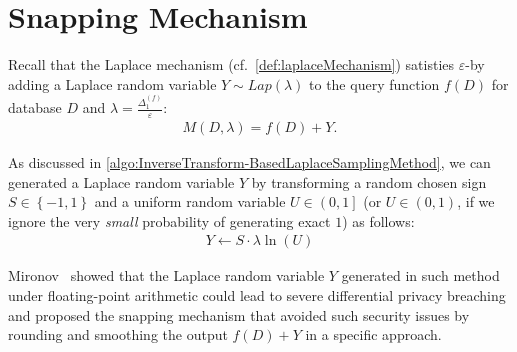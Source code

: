 \section{Snapping Mechanism}
\label{sec:snappingMechanism}
Recall that the Laplace mechanism (cf.~\autoref{def:laplaceMechanism}) satisties $\varepsilon$-\differentialprivacy by adding a Laplace random variable $Y \sim Lap\left(\lambda\right) $ to the query function $f\left(D\right)  $ for database $D$ and $\lambda = \frac{\Delta _{1}^{\left(f\right)}}{\varepsilon }$:
\begin{equation}
    \begin{split}
        M\left(D, \lambda\right)=f\left(D\right)+Y.
    \end{split}
\end{equation}


As discussed in \autoref{algo:InverseTransform-BasedLaplaceSamplingMethod}, we can generated a Laplace random variable $Y$ by transforming a random chosen sign $S\in \left\{-1,1\right\} $ and a uniform random variable $U \in \left(0,1\right] $ (or $U \in \left(0,1\right) $, if we ignore the very \textit{small} probability of generating exact $1$) as follows:
\begin{equation}
    \begin{split}
        Y \gets S \cdot \lambda \ln\left(U\right)
    \end{split}
\end{equation}

Mironov~\cite{mironov2012significance} showed that the Laplace random variable $Y$ generated in such method under floating-point arithmetic could lead to severe differential privacy breaching and proposed the snapping mechanism that avoided such security issues by rounding and smoothing the output $f\left(D\right)+Y$ in a specific approach.


